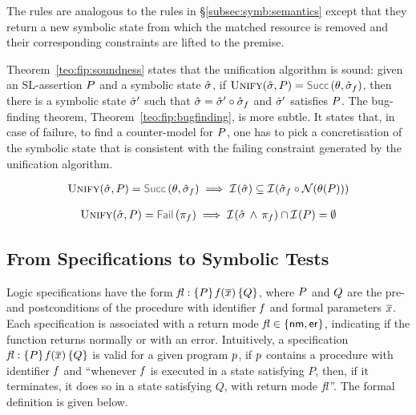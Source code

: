The rules are analogous to the rules in \S\ref{subsec:symb:semantics} except that they return a new symbolic state 
from which the matched resource is removed and their corresponding constraints are lifted to the premise. 

Theorem~\ref{teo:fip:soundness} states that the unification algorithm is sound: 
given an SL-assertion $P$ and a symbolic state $\hat{\sigma}$, if
$\unificationfun(\sstate, \pass) = \success{\subst, \sstate_f}$, then there is a symbolic state
$\hat{\sigma}'$ such that $\hat{\sigma} = \hat{\sigma}' \circ \hat{\sigma}_f$ and $\hat{\sigma}'$ satisfies $P$. 
The bug-finding theorem, Theorem~\ref{teo:fip:bugfinding}, is more subtle. It states that, 
in case of failure, to find a counter-model for $P$, one has to pick a concretisation of the 
symbolic state that is consistent with the failing constraint generated by the unification algorithm.


\begin{theorem}\label{teo:fip:soundness}
$$
\begin{array}{l}
	\unificationfun(\sstate, \pass) = \success{\subst, \sstate_f}
        \implies 
        \interpret{}{}(\sstate) \subseteq \interpret{}{}(\sstate_f \statecompose \normaliser(\subst(\pass)))
\end{array}
$$ 
\end{theorem}

\begin{theorem}\label{teo:fip:bugfinding}
$$
\begin{array}{l}
\unificationfun(\sstate, \pass) = \fail{\pc_f} 
   \implies
   \interpret{}{}(\sstate \, \wedge \, \pc_f) \cap \interpret{}{}(\pass) = \emptyset
\end{array}
$$ 
\end{theorem}



\subsection{From Specifications to Symbolic Tests}\label{specs:to:symbolic:tests}

\jsil Logic specifications have the form ${\mathit{fl}} : \{ P \} \, \mathit{f}(\overline{x}) \, \{ Q \}$, where $P$ and $Q$ are the 
pre- and postconditions of the procedure with identifier $\mathit{f}$ and formal parameters $\overline{x}$. 
Each specification is associated with a return mode $\mathit{fl} \in \{ {\sf nm}, {\sf er} \}$, indicating if the function
 returns normally or with an error. 
 Intuitively, a specification ${\mathit{fl}} : \{ P \} \, \mathit{f}(\overline{x}) \, \{ Q \}$ is 
valid for a given \jsil program $p$, if $p$ contains a procedure with identifier 
$\mathit{f}$ and ``whenever $\mathit{f}$ is executed in a state satisfying $P$, then, 
if it terminates, it does so in a state satisfying $Q$, with return mode $\mathit{fl}$''.
The formal definition is given below. 


